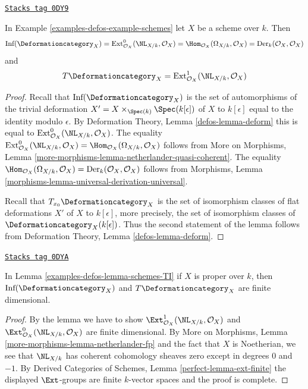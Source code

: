 \begin{lemma}[Schemes TI]
\label{examples-defos-lemma-schemes-TI}
\href{https://stacks.math.columbia.edu/tag/0DY9}{\texttt{Stacks tag 0DY9}}

In Example \ref{examples-defos-example-schemes} let $X$ be a scheme over $k$. Then
$$
\text{Inf}(\Deformationcategory_X) =
\text{Ext}^0_{\mathcal{O}_X}(\NL_{X/k}, \mathcal{O}_X) =
\Hom_{\mathcal{O}_X}(\Omega_{X/k}, \mathcal{O}_X) =
\text{Der}_k(\mathcal{O}_X, \mathcal{O}_X)
$$
and
$$
T\Deformationcategory_X =
\text{Ext}^1_{\mathcal{O}_X}(\NL_{X/k}, \mathcal{O}_X)
$$
\end{lemma}

\begin{proof}
Recall that $\text{Inf}(\Deformationcategory_X)$ is the set of
automorphisms of the trivial deformation
$X' = X \times_{\Spec(k)} \Spec(k[\epsilon])$ of $X$ to $k[\epsilon]$
equal to the identity modulo $\epsilon$.
By Deformation Theory, Lemma \ref{defos-lemma-deform}
this is equal to $\text{Ext}^0_{\mathcal{O}_X}(\NL_{X/k}, \mathcal{O}_X)$.
The equality $\text{Ext}^0_{\mathcal{O}_X}(\NL_{X/k}, \mathcal{O}_X) =
\Hom_{\mathcal{O}_X}(\Omega_{X/k}, \mathcal{O}_X)$ follows from
More on Morphisms, Lemma
\ref{more-morphisms-lemma-netherlander-quasi-coherent}.
The equality
$\Hom_{\mathcal{O}_X}(\Omega_{X/k}, \mathcal{O}_X) =
\text{Der}_k(\mathcal{O}_X, \mathcal{O}_X)$
follows from Morphisms, Lemma
\ref{morphisms-lemma-universal-derivation-universal}.

\medskip\noindent
Recall that $T_{x_0}\Deformationcategory_X$ is the set of isomorphism classes
of flat deformations $X'$ of $X$ to $k[\epsilon]$, more precisely,
the set of isomorphism classes of $\Deformationcategory_X(k[\epsilon])$.
Thus the second statement of the lemma follows from
Deformation Theory, Lemma \ref{defos-lemma-deform}.
\end{proof}

\begin{lemma}
\label{examples-defos-lemma-proper-schemes-TI}
\href{https://stacks.math.columbia.edu/tag/0DYA}{\texttt{Stacks tag 0DYA}}

In Lemma \ref{examples-defos-lemma-schemes-TI} if $X$ is proper over $k$, then
$\text{Inf}(\Deformationcategory_X)$ and $T\Deformationcategory_X$ are
finite dimensional.
\end{lemma}

\begin{proof}
By the lemma we have to show
$\Ext^1_{\mathcal{O}_X}(\NL_{X/k}, \mathcal{O}_X)$ and
$\Ext^0_{\mathcal{O}_X}(\NL_{X/k}, \mathcal{O}_X)$ are finite
dimensional. By More on Morphisms, Lemma
\ref{more-morphisms-lemma-netherlander-fp}
and the fact that $X$ is Noetherian, we see that
$\NL_{X/k}$ has coherent cohomology sheaves zero except
in degrees $0$ and $-1$.
By Derived Categories of Schemes, Lemma \ref{perfect-lemma-ext-finite}
the displayed $\Ext$-groups are finite $k$-vector spaces
and the proof is complete.
\end{proof}


